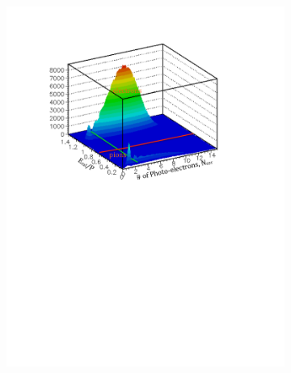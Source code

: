 \documentclass[12pt]{article}
\begin{document}
\begin{figure}[htbp]
\centering
        \begin{subfigure}[htbp]{0.45\textwidth}
               \centering
               \includegraphics[width=\textwidth]{cer_calo}
                \label{dctime_72994}
      \end{subfigure}
          \begin{subfigure}[htbp]{0.20\textwidth}
                \centering

\end{subfigure}
\end{figure}
\end{document}
